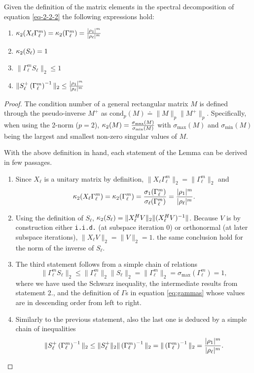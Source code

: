 \begin{lemma}
\label{th:2-1}
Given the definition of the matrix elements in the spectral decomposition of equation \eqref{eq-2-2-2} the following expressions hold:
\begin{enumerate}
\setlength\itemsep{3pt}
    \item $\mathop\mathrm{\kappa}_2\nolimits(X_\ell \Gamma_\ell^m) = \mathop\mathrm{\kappa}_2\nolimits(\Gamma_\ell^m) = \frac{|\rho_{1}|^{m}}{|\rho_{\ell}|^{m}}$ 
    \item $\mathop\mathrm{\kappa}_2\nolimits(S_\ell) = 1$
    \item $\|\Gamma_\ell^m S_\ell\|_2 \leq 1$
    \item $\|S_\ell^+ \left(\Gamma_\ell^m\right)^{-1}\|_2 \leq \frac{|\rho_{1}|^{m}}{|\rho_{\ell}|^{m}}$
\end{enumerate}
\end{lemma}
\begin{proof}
The condition number of a general rectangular matrix $M$ is defined through the pseudo-inverse $M^+$ as $\textrm{cond}_p(M) \doteq \|M\|_p \|M^+\|_p $. Specifically, when using the 2-norm ($p=2$), $\mathop\mathrm{\kappa}_2\nolimits(M) = \frac{\sigma_{\textrm{max}}(M)}{\sigma_{\textrm{min}}(M)}$ with $\sigma_{\textrm{max}}(M)$ and $\sigma_{\textrm{min}}(M)$ being the largest and smallest non-zero singular values of $M$. 

With the above definition in hand, each statement of the Lemma can be derived in few passages.
\begin{enumerate}
\setlength\itemsep{3pt}
    \item Since $X_\ell$ is a unitary matrix by definition, $\|X_\ell \Gamma_\ell^m\|_2 = \|\Gamma_\ell^m\|_2$ and 
    \[
    \mathop\mathrm{\kappa}_2\nolimits(X_\ell \Gamma_\ell^m) = \mathop\mathrm{\kappa}_2\nolimits(\Gamma_\ell^m) = \frac{\sigma_1(\Gamma_\ell^m)}{\sigma_\ell(\Gamma_\ell^m)} = \frac{|\rho_{1}|^{m}}{|\rho_{\ell}|^{m}}.
    \]  
    \item Using the definition of $S_\ell$, $\mathop\mathrm{\kappa}_2\nolimits(S_\ell) = \|X_\ell^H V\|_2 \|(X_\ell^H V)^{-1}\|$. Because $V$ is by construction either \texttt{i.i.d.} (at subspace iteration 0) or orthonormal (at later subspace iterations), $\|X_\ell V\|_2 = \|V\|_2 = 1$. the same conclusion hold for the norm of the inverse of $S_\ell$.
    \item The third statement follows from a simple chain of relations
    \[
    \|\Gamma_\ell^m S_\ell\|_2 \leq \|\Gamma_\ell^m\|_2 \|S_\ell\|_2 = \|\Gamma_\ell^m\|_2 = \sigma_{\textrm{max}}(\Gamma_\ell^m) = 1,
    \]
    where we have used the Schwarz inequality, the intermediate results from statement 2., and the definition of $\Gamma$s in equation \eqref{eq:gammas} whose values are in descending order from left to right.
    \item Similarly to the previous statement, also the last one is deduced by a simple chain of inequalities 
    \[
    \|S_\ell^+ \left(\Gamma_\ell^m\right)^{-1}\|_2 \leq \|S_\ell^+\|_2 \|\left(\Gamma_\ell^m\right)^{-1}\|_2 = \|\left(\Gamma_\ell^m\right)^{-1}\|_2 = \frac{|\rho_{1}|^{m}}{|\rho_{\ell}|^{m}}.
    \]
\end{enumerate}
\end{proof}
